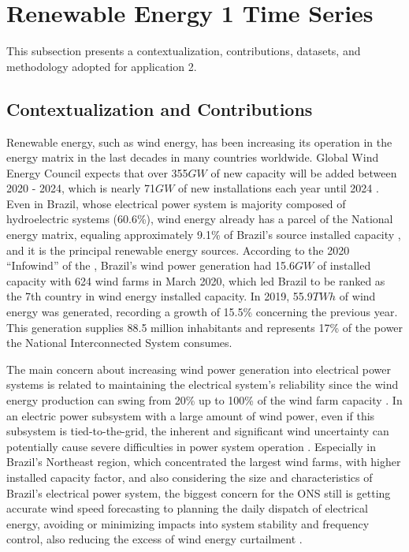 \section{Renewable Energy 1 Time Series} \label{sec:renewable1}

This subsection presents a contextualization, contributions, datasets, and methodology adopted for application 2.

\subsection{Contextualization and Contributions}

Renewable energy, such as wind energy, has been increasing its operation in the energy matrix in the last decades in many countries worldwide. Global Wind Energy Council expects that over 355$GW$ of new capacity will be added between 2020 - 2024, which is nearly 71$GW$ of new installations each year until 2024 \cite{globalwindenergycouncilgwec2020Market}. Even in Brazil, whose electrical power system is majority composed of hydroelectric systems (60.6\%), wind energy already has a parcel of the National energy matrix, equaling approximately 9.1\% of Brazil's source installed capacity \cite{moreno2020Multistep}, and it is the principal renewable energy sources. According to the 2020 ``Infowind'' of the , Brazil's wind power generation had 15.6$GW$ of installed capacity with 624 wind farms in March 2020, which led Brazil to be ranked as the 7th country in wind energy installed capacity. In 2019, 55.9$TWh$ of wind energy was generated, recording a growth of 15.5\% concerning the previous year. This generation supplies 88.5 million inhabitants and represents 17\% of the power the National Interconnected System consumes.

The main concern about increasing wind power generation into electrical power systems is related to maintaining the electrical system's reliability since the wind energy production can swing from 20\% up to 100\% of the wind farm capacity \cite{vatanpour2018Impact}. In an electric power subsystem with a large amount of wind power, even if this subsystem is tied-to-the-grid, the inherent and significant wind uncertainty can potentially cause severe difficulties in power system operation \cite{li2019Smart}. Especially in Brazil's Northeast region, which concentrated the largest wind farms, with higher installed capacity factor, and also considering the size and characteristics of Brazil's electrical power system, the biggest concern for the \ac{ONS} still is getting accurate wind speed forecasting to planning the daily dispatch of electrical energy, avoiding or minimizing impacts into system stability and frequency control, also reducing the excess of wind energy curtailment \cite{moreno2020Multistep}.


